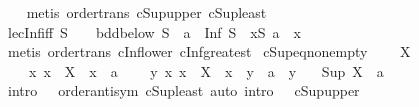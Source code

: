 \begin{isabellebody}
%
\isadelimproof
\ \ %
\endisadelimproof
%
\isatagproof
{}\isamarkupfalse%
\ {\isacharparenleft}{\kern0pt}metis\ order{\isacharunderscore}{\kern0pt}trans\ cSup{\isacharunderscore}{\kern0pt}upper\ cSup{\isacharunderscore}{\kern0pt}least{\isacharparenright}{\kern0pt}%
\endisatagproof
{\isafoldproof}%
%
\isadelimproof
\isanewline
%
\endisadelimproof
\isanewline
{}\isamarkupfalse%
\ le{\isacharunderscore}{\kern0pt}cInf{\isacharunderscore}{\kern0pt}iff{\isacharcolon}{\kern0pt}\ {\isachardoublequoteopen}S\ {\isasymnoteq}\ {\isacharbraceleft}{\kern0pt}{\isacharbraceright}{\kern0pt}\ {\isasymLongrightarrow}\ bdd{\isacharunderscore}{\kern0pt}below\ S\ {\isasymLongrightarrow}\ a\ {\isasymle}\ Inf\ S\ {\isasymlongleftrightarrow}\ {\isacharparenleft}{\kern0pt}{\isasymforall}x{\isasymin}S{\isachardot}{\kern0pt}\ a\ {\isasymle}\ x{\isacharparenright}{\kern0pt}{\isachardoublequoteclose}\isanewline
%
\isadelimproof
\ \ %
\endisadelimproof
%
\isatagproof
{}\isamarkupfalse%
\ {\isacharparenleft}{\kern0pt}metis\ order{\isacharunderscore}{\kern0pt}trans\ cInf{\isacharunderscore}{\kern0pt}lower\ cInf{\isacharunderscore}{\kern0pt}greatest{\isacharparenright}{\kern0pt}%
\endisatagproof
{\isafoldproof}%
%
\isadelimproof
\isanewline
%
\endisadelimproof
\isanewline
{}\isamarkupfalse%
\ cSup{\isacharunderscore}{\kern0pt}eq{\isacharunderscore}{\kern0pt}non{\isacharunderscore}{\kern0pt}empty{\isacharcolon}{\kern0pt}\isanewline
\ \ \ {}{\isacharcolon}{\kern0pt}\ {\isachardoublequoteopen}X\ {\isasymnoteq}\ {\isacharbraceleft}{\kern0pt}{\isacharbraceright}{\kern0pt}{\isachardoublequoteclose}\isanewline
\ \ \ {}{\isacharcolon}{\kern0pt}\ {\isachardoublequoteopen}{\isasymAnd}x{\isachardot}{\kern0pt}\ x\ {\isasymin}\ X\ {\isasymLongrightarrow}\ x\ {\isasymle}\ a{\isachardoublequoteclose}\isanewline
\ \ \ {}{\isacharcolon}{\kern0pt}\ {\isachardoublequoteopen}{\isasymAnd}y{\isachardot}{\kern0pt}\ {\isacharparenleft}{\kern0pt}{\isasymAnd}x{\isachardot}{\kern0pt}\ x\ {\isasymin}\ X\ {\isasymLongrightarrow}\ x\ {\isasymle}\ y{\isacharparenright}{\kern0pt}\ {\isasymLongrightarrow}\ a\ {\isasymle}\ y{\isachardoublequoteclose}\isanewline
\ \ \ {\isachardoublequoteopen}Sup\ X\ {\isacharequal}{\kern0pt}\ a{\isachardoublequoteclose}\isanewline
%
\isadelimproof
\ \ %
\endisadelimproof
%
\isatagproof
{}\isamarkupfalse%
\ {\isacharparenleft}{\kern0pt}intro\ {}\ {}\ order{\isachardot}{\kern0pt}antisym\ cSup{\isacharunderscore}{\kern0pt}least{\isacharparenright}{\kern0pt}\ {\isacharparenleft}{\kern0pt}auto\ intro{\isacharcolon}{\kern0pt}\ {}\ {}\ cSup{\isacharunderscore}{\kern0pt}upper{\isacharparenright}{\kern0pt}%

\end{isabellebody}
